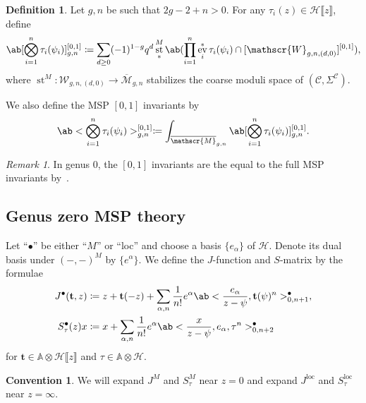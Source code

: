 \documentclass[10pt]{amsart}
\theoremstyle{definition}
\newtheorem{defn}[thm]{Definition}
\newtheorem{conv}[thm]{Convention}
\theoremstyle{remark}
\newtheorem{rmk}[thm]{Remark}
\theoremstyle{plain}
\theoremstyle{definition}
\theoremstyle{remark}
\newcommand{\A}{\mathbb{A}}
\newcommand{\msc}[1]{\mathscr{#1}}
\newcommand{\mbf}[1]{\mathbf{#1}}
\newcommand{\mr}[1]{\mathrm{#1}}
\newcommand{\ol}[1]{\overline{#1}}
\newcommand{\1}{\mathbf{1}}
\newcommand{\2}{\mathbf{2}}
\newcommand{\3}{\mathbf{3}}
\newcommand{\loc}{\mr{loc}}
\newcommand{\ps}[1]{\llbracket #1 \rrbracket}
\DeclareMathOperator{\ev}{ev}
\DeclareMathOperator{\st}{st}
\numberwithin{equation}{section}
\begin{document}
\begin{defn}
    Let $g,n$ be such that $2g-2+n > 0$. For any $\tau_i(z) \in \msc{H}\ps{z}$, define
    \[\ab[\bigotimes_{i=1}^n \tau_i(\psi_i)]_{g,n}^{[0,1]} \coloneqq \sum_{d \geq 0} (-1)^{1-g} q^d \st^{M}_* \ab(\prod_{i=1}^n \ev_i^* \tau_i(\psi_i) \cap [\msc{W}_{g,n,(d,0)}]^{[0,1]}), \]
    where $\st^M \colon \msc{W}_{g,n,(d,0)} \to \ol{\msc{M}}_{g,n}$ stabilizes the coarse moduli space of $(\msc{C}, \Sigma^{\msc{C}})$.

    We also define the MSP $[0,1]$ invariants by
    \[ \ab<\bigotimes_{i=1}^n \tau_i(\psi_i)>_{g,n}^{[0,1]} \coloneqq \int_{\ol{\msc{M}}_{g,n}} \ab[\bigotimes_{i=1}^n \tau_i(\psi_i)]_{g,n}^{[0,1]}. \]
\end{defn}

\begin{rmk}
    In genus $0$, the $[0,1]$ invariants are the equal to the full MSP invariants by~.
\end{rmk}


\subsection{Genus zero MSP theory}%
\label{sub:genus zero msp}

Let ``$\bullet$'' be either ``$M$'' or ``loc'' and choose a basis $\{e_{\alpha}\}$ of $\msc{H}$. Denote its dual basis under $(-,-)^M$ by $\{e^{\alpha}\}$. We define the $J$-function and $S$-matrix by the formulae
\begin{align}
    J^{\bullet}(\mbf{t}, z) &\coloneqq z + \mbf{t}(-z) + \sum_{\alpha, n} \frac{1}{n!} e^{\alpha} \ab<\frac{e_{\alpha}}{z-\psi}, \mbf{t}(\psi)^n>_{0,n+1}^{\bullet}, \label{eqn:jfunction} \\
    S_{\tau}^{\bullet}(z)x &\coloneqq x + \sum_{\alpha, n} \frac{1}{n!} e^{\alpha} \ab<\frac{x}{z-\psi},e_{\alpha}, \tau^n>_{0,n+2}^{\bullet}  \label{eqn:smatrix}
\end{align}
for $\mbf{t} \in \A \otimes \msc{H}\ps{z}$ and $\tau \in \A \otimes \msc{H}$.

\begin{conv}
    We will expand $J^M$ and $S^M_{\tau}$ near $z=0$ and expand $J^{\loc}$ and $S^{\loc}_{\tau}$ near $z=\infty$.
\end{conv}
\end{document}
